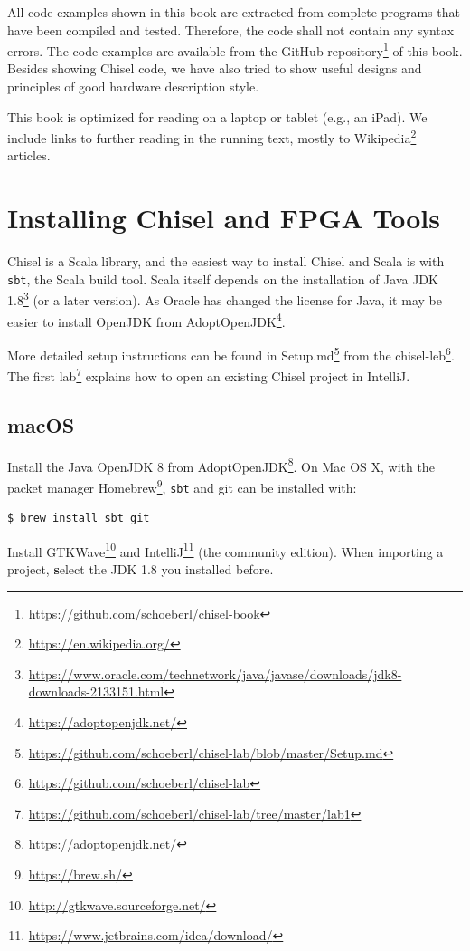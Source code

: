 \documentclass[%
    10pt,
    headinclude, footexclude,
    openright, %
    notitlepage,
    cleardoubleempty,
    headsepline,
    pointlessnumbers,
    bibtotoc, idxtotoc,
    ]{scrbook}
\newcommand{\code}[1]{{\small{\texttt{#1}}}}
\newcommand{\myref}[2]{\href{#1}{#2}}
\renewcommand{\myref}[2]{{#2}{\footnote{\url{#1}}}}
\begin{document}
All code examples shown in this book are extracted from complete programs
that have been compiled and tested. Therefore, the code shall not contain
any syntax errors. The code examples are available from the
\myref{https://github.com/schoeberl/chisel-book}{GitHub repository}
of this book.
Besides showing Chisel code, we have also tried to show useful designs and
principles of good hardware description style.

This book is optimized for reading on a laptop or tablet (e.g., an iPad).
We include links to further reading in the running text, mostly to
\myref{https://en.wikipedia.org/}{Wikipedia} articles.

\section{Installing Chisel and FPGA Tools}

Chisel is a Scala library, and the easiest way to install Chisel and Scala is
with \code{sbt}, the Scala build tool. Scala itself depends on the installation
of \myref{https://www.oracle.com/technetwork/java/javase/downloads/jdk8-downloads-2133151.html}{Java JDK 1.8}
(or a later version).
As Oracle has changed the license for Java, it may be easier to
install OpenJDK from \myref{https://adoptopenjdk.net/}{AdoptOpenJDK}.

More detailed setup instructions can be found in
\myref{https://github.com/schoeberl/chisel-lab/blob/master/Setup.md}{Setup.md}
from the \myref{https://github.com/schoeberl/chisel-lab}{chisel-leb}.
The \myref{https://github.com/schoeberl/chisel-lab/tree/master/lab1}{first lab}
explains how to open an existing Chisel project in IntelliJ.

\subsection{macOS}

Install the Java OpenJDK 8 from \myref{https://adoptopenjdk.net/}{AdoptOpenJDK}.
On Mac OS X, with the packet manager \myref{https://brew.sh/}{Homebrew},
\code{sbt} and git can be installed with:

\begin{verbatim}
$ brew install sbt git
\end{verbatim}

Install \myref{http://gtkwave.sourceforge.net/}{GTKWave} and
\myref{https://www.jetbrains.com/idea/download/}{IntelliJ} (the community edition).
When importing a project, {\textbf select the JDK 1.8} you installed before.
\end{document}
